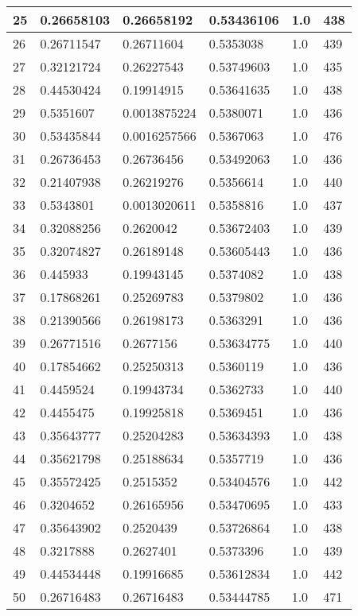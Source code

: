 \begin{longtable}{|l|l|l|l|l|l|}
25 & 0.26658103 & 0.26658192 & 0.53436106 & 1.0 & 438 \\ \hline 
26 & 0.26711547 & 0.26711604 & 0.5353038 & 1.0 & 439 \\ \hline 
27 & 0.32121724 & 0.26227543 & 0.53749603 & 1.0 & 435 \\ \hline 
28 & 0.44530424 & 0.19914915 & 0.53641635 & 1.0 & 438 \\ \hline 
29 & 0.5351607 & 0.0013875224 & 0.5380071 & 1.0 & 436 \\ \hline 
30 & 0.53435844 & 0.0016257566 & 0.5367063 & 1.0 & 476 \\ \hline 
31 & 0.26736453 & 0.26736456 & 0.53492063 & 1.0 & 436 \\ \hline 
32 & 0.21407938 & 0.26219276 & 0.5356614 & 1.0 & 440 \\ \hline 
33 & 0.5343801 & 0.0013020611 & 0.5358816 & 1.0 & 437 \\ \hline 
34 & 0.32088256 & 0.2620042 & 0.53672403 & 1.0 & 439 \\ \hline 
35 & 0.32074827 & 0.26189148 & 0.53605443 & 1.0 & 436 \\ \hline 
36 & 0.445933 & 0.19943145 & 0.5374082 & 1.0 & 438 \\ \hline 
37 & 0.17868261 & 0.25269783 & 0.5379802 & 1.0 & 436 \\ \hline 
38 & 0.21390566 & 0.26198173 & 0.5363291 & 1.0 & 436 \\ \hline 
39 & 0.26771516 & 0.2677156 & 0.53634775 & 1.0 & 440 \\ \hline 
40 & 0.17854662 & 0.25250313 & 0.5360119 & 1.0 & 436 \\ \hline 
41 & 0.4459524 & 0.19943734 & 0.5362733 & 1.0 & 440 \\ \hline 
42 & 0.4455475 & 0.19925818 & 0.5369451 & 1.0 & 436 \\ \hline 
43 & 0.35643777 & 0.25204283 & 0.53634393 & 1.0 & 438 \\ \hline 
44 & 0.35621798 & 0.25188634 & 0.5357719 & 1.0 & 436 \\ \hline 
45 & 0.35572425 & 0.2515352 & 0.53404576 & 1.0 & 442 \\ \hline 
46 & 0.3204652 & 0.26165956 & 0.53470695 & 1.0 & 433 \\ \hline 
47 & 0.35643902 & 0.2520439 & 0.53726864 & 1.0 & 438 \\ \hline 
48 & 0.3217888 & 0.2627401 & 0.5373396 & 1.0 & 439 \\ \hline 
49 & 0.44534448 & 0.19916685 & 0.53612834 & 1.0 & 442 \\ \hline 
50 & 0.26716483 & 0.26716483 & 0.53444785 & 1.0 & 471 \\ \hline 
\end{longtable}